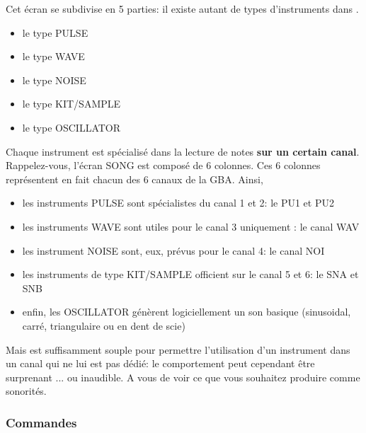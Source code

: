Cet écran se subdivise en 5 parties: il existe autant de types d'instruments dans \FAT.
\medskip

\begin{itemize}
    \item{le type PULSE}
    \item{le type WAVE}
    \item{le type NOISE}
    \item{le type KIT/SAMPLE}
    \item{le type OSCILLATOR}
\end{itemize}\medskip

 Chaque instrument est spécialisé dans la lecture de notes {\bf sur un certain canal}.
 Rappelez-vous, l'écran SONG est composé de 6 colonnes.
 Ces 6 colonnes représentent en fait chacun des 6 canaux de la GBA. Ainsi,
 \medskip

 \begin{itemize}
    \item{les instruments PULSE sont spécialistes du canal 1 et 2: le PU1 et PU2}
    \item{les instruments WAVE sont utiles pour le canal 3 uniquement : le canal WAV}
    \item{les instrument NOISE sont, eux, prévus pour le canal 4: le canal NOI}
    \item{les instruments de type KIT/SAMPLE officient sur le canal 5 et 6: le SNA et SNB}
    \item{enfin, les OSCILLATOR génèrent logiciellement un son basique (sinusoidal, carré, triangulaire ou en dent de scie)}
 \end{itemize}\medskip

 Mais \FAT est suffisamment souple pour permettre l'utilisation d'un instrument dans un canal qui ne lui est pas dédié:
 le comportement peut cependant être surprenant ... ou inaudible.
 A vous de voir ce que vous souhaitez produire comme sonorités.

\subsubsection{Commandes}

